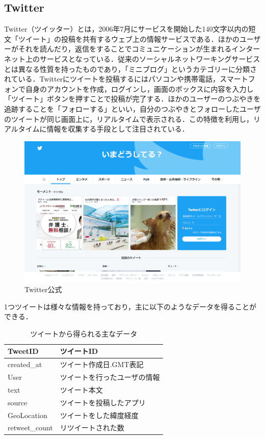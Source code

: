 \subsection{Twitter}
Twitter（ツイッター）とは，2006年7月にサービスを開始した140文字以内の短文「ツイート」の投稿を共有するウェブ上の情報サービスである．ほかのユーザーがそれを読んだり，返信をすることでコミュニケーションが生まれるインターネット上のサービスとなっている．従来のソーシャルネットワーキングサービスとは異なる性質を持ったものであり，「ミニブログ」というカテゴリーに分類されている．Twitterにツイートを投稿するにはパソコンや携帯電話，スマートフォンで自身のアカウントを作成，ログインし，画面のボックスに内容を入力し「ツイート」ボタンを押すことで投稿が完了する．ほかのユーザーのつぶやきを追跡することを「フォローする」といい，自分のつぶやきとフォローしたユーザのツイートが同じ画面上に，リアルタイムで表示される．この特徴を利用し，リアルタイムに情報を収集する手段として注目されている\cite{03}．
\begin{figure}[htb]
\centering
\includegraphics[width=13cm]{img/Twitterweb.png}
\caption{Twitter公式}
\end{figure}
\newpage
1つツイートは様々な情報を持っており，主に以下のようなデータを得ることができる\cite{04}．
\begin{table}[htb]
   \caption{ツイートから得られる主なデータ}
  \begin{tabular}{|p{6cm}|p{6cm}|} \hline 
   TweetID & ツイートID \\ \hline
   created\_at  & ツイート作成日.GMT表記   \\ \hline
   User & ツイートを行ったユーザの情報 \\ \hline
   text & ツイート本文 \\ \hline
   source & ツイートを投稿したアプリ \\ \hline
   GeoLocation & ツイートをした緯度経度 \\ \hline
   retweet\_count & リツイートされた数 \\ \hline 
  \end{tabular}
\end{table}

